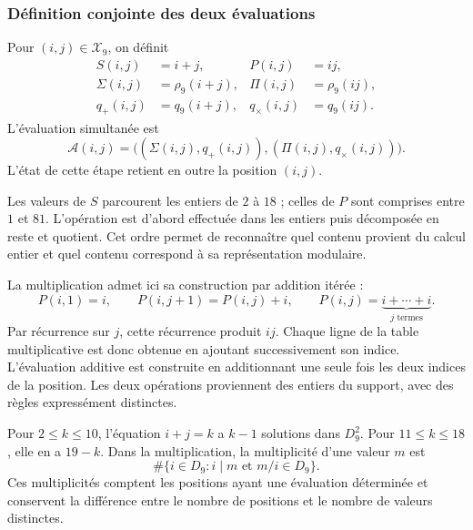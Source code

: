 \subsubsection{Définition conjointe des deux évaluations}

\begin{definicion}
\label{def:app-evaluacion}
Pour $(i,j)\in\mathcal X_9$, on définit
\begin{align}
 S(i,j)&=i+j, & P(i,j)&=ij,\\
 \Sigma(i,j)&=\rho_9(i+j), & \Pi(i,j)&=\rho_9(ij),\\
 q_+(i,j)&=q_9(i+j), &q_\times(i,j)&=q_9(ij).
\end{align}
L'évaluation simultanée est
\begin{equation}
 \mathcal A(i,j)=\bigl((\Sigma(i,j),q_+(i,j)),
                         (\Pi(i,j),q_\times(i,j))\bigr).
 \label{eq:app-two-evaluations}
\end{equation}
L'état de cette étape retient en outre la position $(i,j)$.
\end{definicion}

Les valeurs de $S$ parcourent les entiers de $2$ à $18$ ; celles de $P$ sont comprises entre $1$ et $81$. L'opération est d'abord effectuée dans les entiers puis décomposée en reste et quotient. Cet ordre permet de reconnaître quel contenu provient du calcul entier et quel contenu correspond à sa représentation modulaire.

La multiplication admet ici sa construction par addition itérée :
\[
 P(i,1)=i,\qquad P(i,j+1)=P(i,j)+i,
 \qquad P(i,j)=\underbrace{i+\cdots+i}_{j\text{ termes}}.
\]
Par récurrence sur $j$, cette récurrence produit $ij$. Chaque ligne de la table multiplicative est donc obtenue en ajoutant successivement son indice. L'évaluation additive est construite en additionnant une seule fois les deux indices de la position. Les deux opérations proviennent des entiers du support, avec des règles expressément distinctes.

Pour $2\leq k\leq10$, l'équation $i+j=k$ a $k-1$ solutions dans $D_9^2$. Pour $11\leq k\leq18$, elle en a $19-k$. Dans la multiplication, la multiplicité d'une valeur $m$ est
\[
 \#\{i\in D_9:i\mid m\text{ et }m/i\in D_9\}.
\]
Ces multiplicités comptent les positions ayant une évaluation déterminée et conservent la différence entre le nombre de positions et le nombre de valeurs distinctes.



